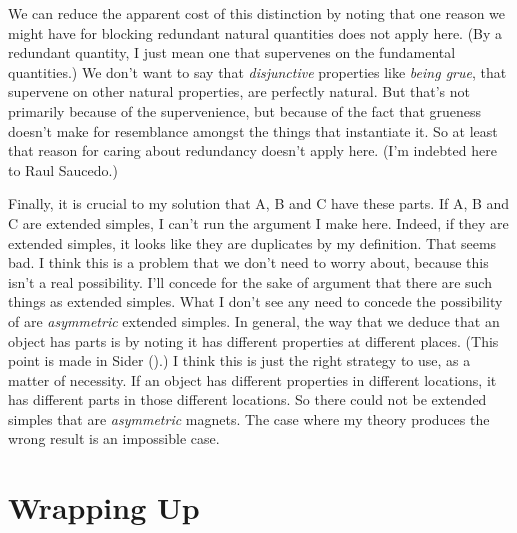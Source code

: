\documentclass[
  11pt,
  letterpaper,
  DIV=11,
  numbers=noendperiod,
  twoside]{scrartcl}
\begin{document}
We can reduce the apparent cost of this distinction by noting that one
reason we might have for blocking redundant natural quantities does not
apply here. (By a redundant quantity, I just mean one that supervenes on
the fundamental quantities.) We don't want to say that
\emph{disjunctive} properties like \emph{being grue}, that supervene on
other natural properties, are perfectly natural. But that's not
primarily because of the supervenience, but because of the fact that
grueness doesn't make for resemblance amongst the things that
instantiate it. So at least that reason for caring about redundancy
doesn't apply here. (I'm indebted here to Raul Saucedo.)

Finally, it is crucial to my solution that A, B and C have these parts.
If A, B and C are extended simples, I can't run the argument I make
here. Indeed, if they are extended simples, it looks like they are
duplicates by my definition. That seems bad. I think this is a problem
that we don't need to worry about, because this isn't a real
possibility. I'll concede for the sake of argument that there are such
things as extended simples. What I don't see any need to concede the
possibility of are \emph{asymmetric} extended simples. In general, the
way that we deduce that an object has parts is by noting it has
different properties at different places. (This point is made in Sider
().) I think this is just the right
strategy to use, as a matter of necessity. If an object has different
properties in different locations, it has different parts in those
different locations. So there could not be extended simples that are
\emph{asymmetric} magnets. The case where my theory produces the wrong
result is an impossible case.

\section{Wrapping Up}\label{wrapping-up}
\end{document}
